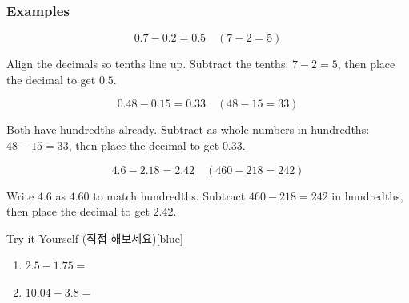 \documentclass[12pt]{book}
\begin{document}
\subsubsection*{Examples}

\[
0.7 - 0.2 = 0.5 \quad (7 - 2 = 5)
\]

Align the decimals so tenths line up.  
Subtract the tenths: $7-2=5$, then place the decimal to get $0.5$.




\[
0.48 - 0.15 = 0.33 \quad (48 - 15 = 33)
\]

Both have hundredths already.  
Subtract as whole numbers in hundredths: $48-15=33$, then place the decimal to get $0.33$.




\[
4.6 - 2.18 = 2.42 \quad (460 - 218 = 242)
\]

Write $4.6$ as $4.60$ to match hundredths.  
Subtract $460-218=242$ in hundredths, then place the decimal to get $2.42$.


\begin{flexbox}{Try it Yourself (직접 해보세요)}[blue]
\begin{enumerate}
  \item $2.5 - 1.75=$ \vspace*{20pt}
  \item $10.04 - 3.8=$ \vspace*{20pt}
\end{enumerate}
\end{flexbox}




\end{document}
